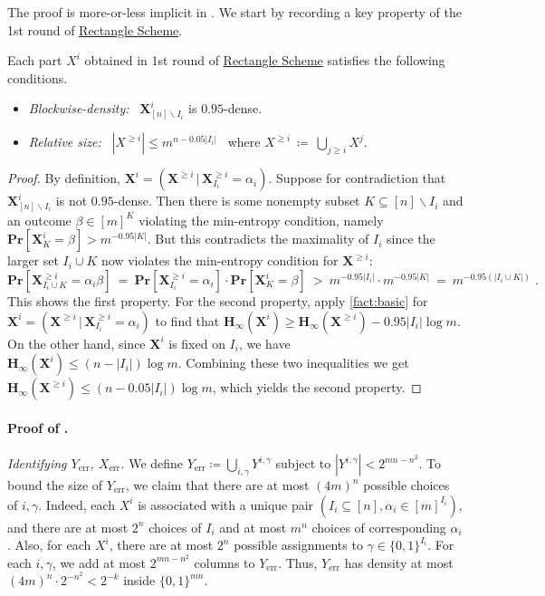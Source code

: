\documentclass{toc}
\newcommand{\rectlemma}{\expref{Lemma}{lem:scheme}\xspace}%
\newcommand{\rectscheme}{\hyperref[alg:partition]{Rectangle Scheme}\xspace}
\renewcommand{\Pr}{\mathbf{Pr}}
\newcommand{\Hmin}{\mathbf{H}_\infty}
\DeclareMathOperator{\err}{err}
\newcommand{\X}{\bm{X}}
\newcommand{\allY}{\{0,1\}^{mn}}
\newcommand{\bit}{\{0,1\}}
\begin{document}
The proof is more-or-less implicit in \cite{goos16rectangles,goos17bpp}. We start by recording a key property of the 1st round of \rectscheme.

\begin{claim}\label{clm:density-restoring}
Each part $X^i$ obtained in 1st round of \rectscheme
%
satisfies the following conditions.  %
\begin{itemize}
\item \emph{Blockwise-density:}~ $\X^i_{[n] \smallsetminus I_i}$ is $0.95$-dense.
\item \emph{Relative size:}~ $|X^{\geqslant i}| \le m^{n - 0.05 |I_i|}$~ where $X^{\geqslant i} ~\coloneqq~ \bigcup_{j \ge i} X^j$.
\end{itemize}
\end{claim}
\begin{proof}
By definition, $\X^i = (\X^{\geqslant i}\, |\, \X^{\geqslant i}_{I_i} = \alpha_i)$. Suppose for contradiction that $\X^i_{[n] \smallsetminus I_i}$ is not $0.95$-dense. Then there is some nonempty subset $K \subseteq [n] \smallsetminus I_i$ and an outcome $\beta \in [m]^K$ violating the min-entropy condition, namely $\Pr[\X^i_K = \beta] > m^{-0.95 |K|}$. But this contradicts the maximality of $I_i$ since the larger set $I_i \cup K$ now violates the min-entropy condition for $\X^{\geqslant i}$:
\[
\Pr[\X^{\geqslant i}_{I_i \cup K} = \alpha_i \beta] ~=~ \Pr[\X^{\geqslant i}_{I_i} = \alpha_i] \cdot \Pr[\X^{i}_K = \beta] ~>~ m^{-0.95 |I_i|} \cdot m^{-0.95 |K|} ~=~ m^{-0.95(|I_i \cup K|)}\;.
\]
This shows the first property. For the second property, apply \autoref{fact:basic} for $\X^i = (\X^{\geqslant i}\, |\, \X^{\geqslant i}_{I_i} = \alpha_i)$ to find that $\Hmin(\X^i) \geq \Hmin(\X^{\geqslant i}) - 0.95|I_i|\log m$. On the other hand, since $\X^i$ is fixed on $I_i$, we have $\Hmin(\X^i)\leq (n-|I_i|)\log m$. Combining these two inequalities we get $\Hmin(\X^{\geqslant i}) \leq (n-0.05|I_i|)\log m$, which yields the second property.
\end{proof}

\paragraph{Proof of \rectlemma.}
\emph{Identifying $Y_{\err}$, $X_{\err}$.}
We define $Y_{\err} \coloneqq \bigcup_{i,\gamma} Y^{i,\gamma}$ subject to $|Y^{i,\gamma}| < 2^{mn-n^2}$. To bound the size of $Y_{\err}$, we claim that there are at most $(4m)^n$ possible choices of $i, \gamma$. Indeed, each $X^i$ is associated with a unique pair $(I_i \subseteq [n], \alpha_i \in [m]^{I_i})$, and there are at most $2^n$ choices of $I_i$ and at most $m^n$ choices of corresponding $\alpha_i$. Also, for each $X^i$, there are at most $2^n$ possible assignments to $\gamma \in \bit^{I_i}$. For each $i, \gamma$, we add at most $2^{mn - n^2}$ columns to $Y_{\err}$. Thus, $Y_{\err}$ has density at most $(4m)^n \cdot 2^{- n^2} < 2^{-k}$ inside $\allY$.
	
\end{document}
